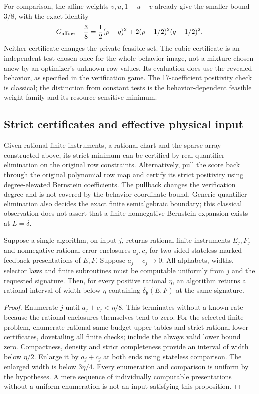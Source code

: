 For comparison, the affine weights $v,u,1-u-v$ already give the
smaller bound $3/8$, with the exact identity
\[
 G_{\rm affine}-\frac38
  =\frac12(p-q)^2+2(p-1/2)^2(q-1/2)^2.
\]
Neither certificate changes the private feasible set. The cubic
certificate is an independent test chosen once for the whole behavior
image, not a mixture chosen anew by an optimizer's unknown row values.
Its evaluation does use the revealed behavior, as specified in the
verification game. The 17-coefficient positivity check is classical;
the distinction from constant tests is the behavior-dependent feasible
weight family and its resource-sensitive minimum.

\subsection{Strict certificates and effective physical input}
Given rational finite instruments, a rational chart and the sparse
array constructed above, its strict minimum can be certified by real
quantifier elimination on the original row constraints. Alternatively,
pull the score back through the original polynomial row map and
certify its strict positivity using degree-elevated Bernstein
coefficients. The pullback changes the verification degree and is not
covered by the behavior-coordinate bound. Generic quantifier
elimination also decides the exact finite semialgebraic boundary;
this classical observation does not assert that a finite nonnegative
Bernstein expansion exists at $L=\delta$.

\begin{proposition}
\label{prop:v17-effective}
Suppose a single algorithm, on input $j$, returns rational finite
instruments $E_j,F_j$ and nonnegative rational error enclosures
$a_j,c_j$ for two-sided stateless marked feedback presentations of
$E,F$. Suppose $a_j+c_j\to0$. All alphabets, widths, selector laws and
finite subroutines must be computable uniformly from $j$ and the
requested signature. Then, for every positive rational $\eta$, an
algorithm returns a rational interval of width below $\eta$ containing
$\delta_{\mathfrak b}(E,F)$ at the same signature.
\end{proposition}
\begin{proof}
Enumerate $j$ until $a_j+c_j<\eta/8$. This terminates without a known
rate because the rational enclosures themselves tend to zero.
For the selected finite problem, enumerate rational same-budget upper
tables and strict rational lower certificates, dovetailing all finite
checks; include the always valid lower bound zero. Compactness,
density and strict completeness provide an interval of width below
$\eta/2$. Enlarge it by $a_j+c_j$ at both ends using stateless
comparison. The enlarged width is below $3\eta/4$. Every enumeration
and comparison is uniform by the hypotheses. A mere sequence of
individually computable presentations without a uniform enumeration
is not an input satisfying this proposition.
\end{proof}
